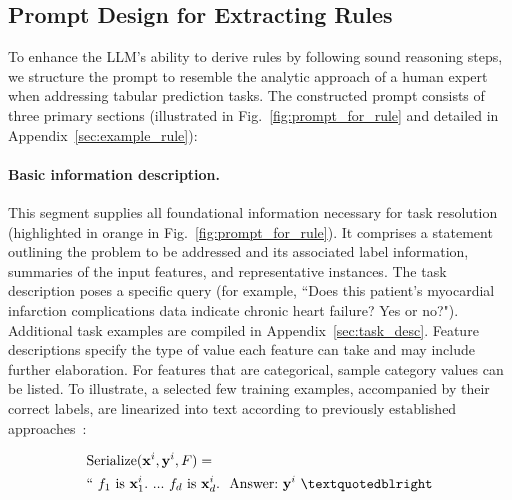 \subsection{Prompt Design for Extracting Rules}
\label{Sec:prompt_design}
To enhance the LLM's ability to derive rules by following sound reasoning steps, we structure the prompt to resemble the analytic approach of a human expert when addressing tabular prediction tasks. The constructed prompt consists of three primary sections (illustrated in Fig.~\ref{fig:prompt_for_rule} and detailed in Appendix~\ref{sec:example_rule}):

\vspace*{-0.12in}
\paragraph{Basic information description.} This segment supplies all foundational information necessary for task resolution (highlighted in orange in Fig.~\ref{fig:prompt_for_rule}). It comprises a statement outlining the problem to be addressed and its associated label information, summaries of the input features, and representative instances. The task description poses a specific query (for example, ``Does this patient's myocardial infarction complications data indicate chronic heart failure? Yes or no?"). Additional task examples are compiled in Appendix~\ref{sec:task_desc}. Feature descriptions specify the type of value each feature can take and may include further elaboration. For features that are categorical, sample category values can be listed. To illustrate, a selected few training examples, accompanied by their correct labels, are linearized into text according to previously established approaches~\cite{dinh2022lift,hegselmann2023tabllm}:

\begin{align}
&\text{Serialize}(\mathbf{x}^i,\mathbf{y}^i, F) = \nonumber \\ 
&``\ f_1\ \text{is}\ \mathbf{x}^i_1.\ ... \ f_d\  \text{is}\  \mathbf{x}^i_d.\ \ \text{Answer:}\  \mathbf{y}^i\ ”
\end{align}

\vspace*{-0.12in}

